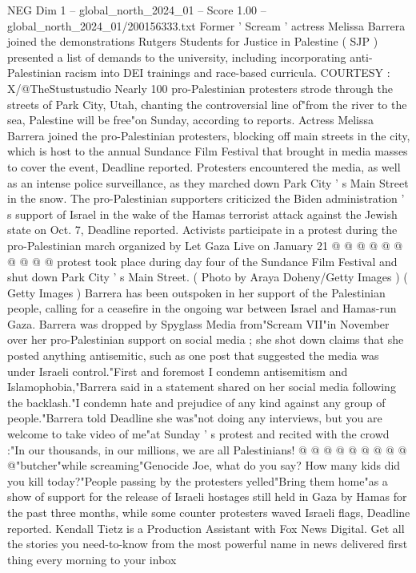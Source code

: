 \begin{textsample}{NEG Dim 1 – global\_north\_2024\_01 – Score 1.00 – global\_north\_2024\_01/200156333.txt}  \label{ex:f1_neg_294}
Former ' Scream ' actress Melissa Barrera joined the demonstrations Rutgers Students for Justice in Palestine ( SJP ) presented a list of demands to the university, including incorporating anti-Palestinian racism into DEI trainings and race-based curricula.
COURTESY : X/@TheStustustudio Nearly 100 pro-Palestinian protesters strode through the streets of Park City, Utah, chanting the controversial line of"from the river to the sea, Palestine will be free"on Sunday, according to reports.
Actress Melissa Barrera joined the pro-Palestinian protesters, blocking off main streets in the city, which is host to the annual Sundance Film Festival that brought in media masses to cover the event, Deadline reported.
Protesters encountered the media, as well as an intense police surveillance, as they marched down Park City ' s Main Street in the snow.
The pro-Palestinian supporters criticized the Biden administration ' s support of Israel in the wake of the Hamas terrorist attack against the Jewish state on Oct. 7, Deadline reported.
Activists participate in a protest during the pro-Palestinian march organized by Let Gaza Live on January 21 @ @ @ @ @ @ @ @ @ @ protest took place during day four of the Sundance Film Festival and shut down Park City ' s Main Street. ( Photo by Araya Doheny/Getty Images ) ( Getty Images ) Barrera has been outspoken in her support of the Palestinian people, calling for a ceasefire in the ongoing war between Israel and Hamas-run Gaza.
Barrera was dropped by Spyglass Media from"Scream VII"in November over her pro-Palestinian support on social media ; she shot down claims that she posted anything antisemitic, such as one post that suggested the media was under Israeli control."First and foremost I condemn antisemitism and Islamophobia,"Barrera said in a statement shared on her social media following the backlash."I condemn hate and prejudice of any kind against any group of people."Barrera told Deadline she was"not doing any interviews, but you are welcome to take video of me"at Sunday ' s protest and recited with the crowd :"In our thousands, in our millions, we are all Palestinians! @ @ @ @ @ @ @ @ @ @"butcher"while screaming"Genocide Joe, what do you say?
How many kids did you kill today?"People passing by the protesters yelled"Bring them home"as a show of support for the release of Israeli hostages still held in Gaza by Hamas for the past three months, while some counter protesters waved Israeli flags, Deadline reported.
Kendall Tietz is a Production Assistant with Fox News Digital.
Get all the stories you need-to-know from the most powerful name in news delivered first thing every morning to your inbox

\end{textsample}
